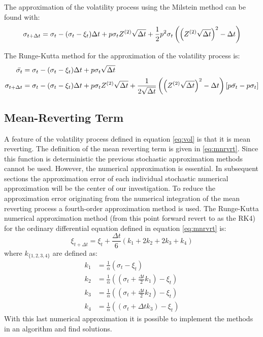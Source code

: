 \documentclass[a4paper,onecolumn]{IEEEtran}
\begin{document}
The approximation of the volatility process using the Milstein method can be
found with:
\begin{equation}
\sigma_{t + \Delta t} = \sigma_t - (\sigma_t - \xi_t)\Delta t +
	p\sigma_t Z^{(2)} \sqrt{\Delta t} + \frac{1}{2}p^2\sigma_t 
	\left(\left(Z^{(2)}\sqrt{\Delta t}\right)^2 - \Delta t\right)
\end{equation}

The Runge-Kutta method for the approximation of the volatility process is:
\begin{equation}
\begin{split}
\bar{\sigma_t} &= \sigma_t  -(\sigma_t - \xi_t)\Delta t + p\sigma_t 
	\sqrt{\Delta t}\\
\sigma_{t + \Delta t} &= \sigma_t - (\sigma_t - \xi_t)\Delta t 
	+ p\sigma_t Z^{(2)}\sqrt{\Delta t}
	+ \frac{1}{2\sqrt{\Delta t}}\left(\left(Z^{(2)}\sqrt{\Delta t}\right)^2 -
\Delta t\right)[p\bar{\sigma_t} - p\sigma_t]
\end{split}
\end{equation}

\subsection{Mean-Reverting Term}
A feature of the volatility process defined in equation \eqref{eq:vol} is that
it is mean reverting. The definition of the mean reverting term is given in
\eqref{eq:mnrvrt}. Since this function is deterministic the previous
stochastic approximation methods cannot be used. However, the numerical
approximation is essential. In subsequent sections the approximation error of
each individual stochastic numerical approximation will be the center of our
investigation. To reduce the approximation error originating from the
numerical integration of the mean reverting process a fourth-order
approximation method is used.  The Runge-Kutta numerical approximation method
(from this point forward revert to as the RK4) for the ordinary differential
equation defined in equation \eqref{eq:mnrvrt} is:
\begin{equation}
\xi_{t + \Delta t} = \xi_t + \frac{\Delta t}{6}(k_1 + 2k_2 + 2k_3 + k_4)
\end{equation}
where $k_{\{1, 2, 3, 4\}}$ are defined as:
\begin{align*}
k_1 &= \frac{1}{\alpha}(\sigma_t - \xi_t)\\
k_2 &= \frac{1}{\alpha}\left(\left(\sigma_t + \frac{\Delta t}{2}k_1\right) -
	\xi_t\right)\\
k_3 &= \frac{1}{\alpha}\left(\left(\sigma_t + \frac{\Delta t}{2}k_2\right) -
	\xi_t\right)\\
k_4 &= \frac{1}{\alpha}\left(\left(\sigma_t + \Delta t k_3\right) -
	\xi_t\right)
\end{align*}
With this last numerical approximation it is possible to implement the methods
in an algorithm and find solutions.
\end{document}
